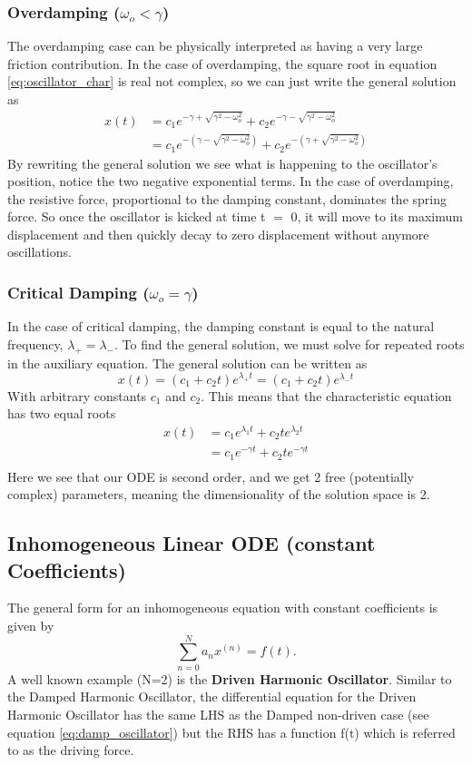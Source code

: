 \documentclass{article}
\newcommand{\be}{\begin{equation}}
\newcommand{\ee}{\end{equation}}
\begin{document}
\subsubsection*{Overdamping ($\omega_o < \gamma$)}
The overdamping case can be physically interpreted as having a very large friction contribution.
In the case of overdamping, the square root in equation \ref{eq:oscillator_char} is real not complex, so we can just write the general solution as
\be
\begin{split}
x(t) &= c_1 e^{-\gamma + \sqrt{\gamma^2 - \omega_o^2}} + c_2 e^{-\gamma - \sqrt{\gamma^2 - \omega_o^2}} \\
&= c_1 e^{-(\gamma - \sqrt{\gamma^2 - \omega_o^2})} + c_2 e^{-(\gamma + \sqrt{\gamma^2 - \omega_o^2})}
\end{split}
\ee
By rewriting the general solution we see what is happening to the oscillator's position, notice the two negative exponential terms.
In the case of overdamping, the resistive force, proportional to the damping constant, dominates the spring force.
So once the oscillator is kicked at time t $=$ 0, it will move to its maximum displacement and then quickly decay to zero displacement without anymore oscillations.

\subsubsection*{Critical Damping ($\omega_o = \gamma$)}
In the case of critical damping, the damping constant is equal to the natural frequency, $\lambda_+ = \lambda_-$.
To find the general solution, we must solve for repeated roots in the auxiliary equation.
The general solution can be written as
\be
x(t) = (c_1 + c_2t)e^{\lambda_+ t} = (c_1 + c_2t)e^{\lambda_- t}
\ee
With arbitrary constants $c_1$ and $c_2$.
This means that the characteristic equation has two equal roots
\be
\begin{split}
x(t) &= c_1 e^{\lambda_1 t} + c_2 te^{\lambda_2 t}\\
&= c_1 e^{-\gamma t} + c_2 te^{-\gamma t}\\
\end{split}
\ee
Here we see that our ODE is second order, and we get 2 free (potentially complex) parameters, meaning the dimensionality of the solution space is 2.

\subsection*{Inhomogeneous Linear ODE (constant Coefficients)}
The general form for an inhomogeneous equation with constant coefficients is given by
\be \label{eq:und_coeff_ex}
	\sum_{n=0}^N a_n x^{(n)} = f(t) .
\ee
A well known example (N=2) is the \textbf{Driven Harmonic Oscillator}.
Similar to the Damped Harmonic Oscillator, the differential equation for the Driven Harmonic Oscillator has the same LHS as the Damped non-driven case (see equation \ref{eq:damp_oscillator}) but the RHS has a function f(t) which is referred to as the driving force.
\end{document}
